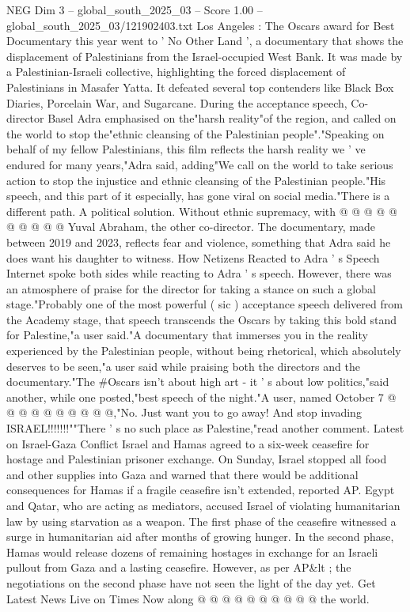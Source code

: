 \begin{textsample}{NEG Dim 3 – global\_south\_2025\_03 – Score 1.00 – global\_south\_2025\_03/121902403.txt}  \label{ex:f3_neg_428}
Los Angeles : The Oscars award for Best Documentary this year went to ' No Other Land ', a documentary that shows the displacement of Palestinians from the Israel-occupied West Bank.
It was made by a Palestinian-Israeli collective, highlighting the forced displacement of Palestinians in Masafer Yatta.
It defeated several top contenders like Black Box Diaries, Porcelain War, and Sugarcane.
During the acceptance speech, Co-director Basel Adra emphasised on the"harsh reality"of the region, and called on the world to stop the"ethnic cleansing of the Palestinian people"."Speaking on behalf of my fellow Palestinians, this film reflects the harsh reality we ' ve endured for many years,"Adra said, adding"We call on the world to take serious action to stop the injustice and ethnic cleansing of the Palestinian people."His speech, and this part of it especially, has gone viral on social media."There is a different path.
A political solution.
Without ethnic supremacy, with @ @ @ @ @ @ @ @ @ @ Yuval Abraham, the other co-director.
The documentary, made between 2019 and 2023, reflects fear and violence, something that Adra said he does want his daughter to witness.
How Netizens Reacted to Adra ' s Speech Internet spoke both sides while reacting to Adra ' s speech.
However, there was an atmosphere of praise for the director for taking a stance on such a global stage."Probably one of the most powerful ( sic ) acceptance speech delivered from the Academy stage, that speech transcends the Oscars by taking this bold stand for Palestine,"a user said."A documentary that immerses you in the reality experienced by the Palestinian people, without being rhetorical, which absolutely deserves to be seen,"a user said while praising both the directors and the documentary."The \#Oscars isn't about high art - it ' s about low politics,"said another, while one posted,"best speech of the night."A user, named October 7 @ @ @ @ @ @ @ @ @ @,"No.
Just want you to go away!
And stop invading ISRAEL!!!!!!!""There ' s no such place as Palestine,"read another comment.
Latest on Israel-Gaza Conflict Israel and Hamas agreed to a six-week ceasefire for hostage and Palestinian prisoner exchange.
On Sunday, Israel stopped all food and other supplies into Gaza and warned that there would be additional consequences for Hamas if a fragile ceasefire isn't extended, reported AP.
Egypt and Qatar, who are acting as mediators, accused Israel of violating humanitarian law by using starvation as a weapon.
The first phase of the ceasefire witnessed a surge in humanitarian aid after months of growing hunger.
In the second phase, Hamas would release dozens of remaining hostages in exchange for an Israeli pullout from Gaza and a lasting ceasefire.
However, as per AP\&lt ; the negotiations on the second phase have not seen the light of the day yet.
Get Latest News Live on Times Now along @ @ @ @ @ @ @ @ @ @ the world.

\end{textsample}
